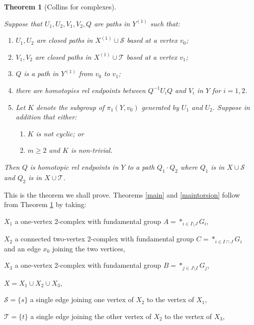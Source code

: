 \documentclass[12pt,a4paper]{amsart}
\def\cS{\mathcal{S}}
\def\cT{\mathcal{T}}
\newtheorem{thm}{Theorem}[section]
\begin{document}
\begin{thm}[Collins for complexes]\label{2ComplexVersion}
	$$ $$
	\vskip -0.8cm
	
	
	Suppose that $U_1,U_2,V_1,V_2, Q$ are   paths in $Y^{(1)}$ such that:
	\begin{enumerate}
		\item[] $U_1, U_2$ are closed paths in $X^{(1)}\cup\cS$ based at a vertex $v_0$;
		\item[] $V_1, V_2$ are closed paths in $X^{(1)}\cup\cT$ based at a vertex $v_1$;
		\item[] $Q$ is a path in $Y^{(1)}$  from $v_0$ to $v_1$;
		\item[] there are homotopies  rel endpoints between $Q^{-1}U_iQ$ and $V_i$ in $Y$ for $i=1,2$.
		\item[]   Let $K$ denote the subgroup of $\pi_1(Y,v_0)$ generated by $U_1$ and $U_2$.  
			Suppose in addition that either:
		\begin{enumerate}
			\item[(for Theorem \ref{main})] $ K$ is not cyclic; or
			\item[(for Theorem \ref{maintorsion})]  $m\ge 2$ and $K$ is non-trivial.
		\end{enumerate} 
	\end{enumerate}
	Then $Q$ is homotopic rel endpoints in $Y$ to a path $Q_1\cdot Q_2$ where $Q_1$ is in $X\cup\cS$ and
	$Q_2$ is in $X\cup\cT$. 		
\end{thm}

This is the theorem we shall prove.   
Theorems \ref{main} and \ref{maintorsion} follow  from Theorem \ref{2ComplexVersion} by taking:

$X_1$  a  one-vertex 2-complex with  fundamental group $A=\ast_{i\in I\setminus J} G_i$,  

$X_2$  a   connected two-vertex 2-complex with fundamental group $C=\ast_{i\in I\cap J} G_i$ 
 and an edge $x_0$ joining the two vertices,

$X_3$  a  one-vertex  2-complex with fundamental group $B=\ast_{j\in J\setminus I} G_j$, 

$X=X_1\cup X_2 \cup X_3$,

$\cS=\{s\}$ a single edge joining 
 one vertex of $X_2$ to 
 the vertex of $X_1$,

$\cT=\{t\}$ a single edge joining the  other vertex of $X_2$ to 
 the vertex of $X_3$,
\end{document}
